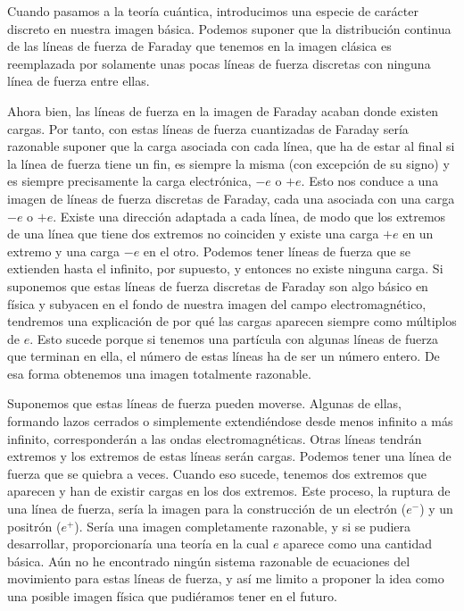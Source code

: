 \documentclass[a4paper, 12pt]{article}
\begin{document}
Cuando pasamos a la teoría cuántica, introducimos una especie de carác\-ter discreto en nuestra imagen básica. Podemos suponer que la distribución continua de las líneas de fuerza de Faraday que tenemos en la imagen clásica es reemplazada por solamente unas pocas líneas de fuerza discretas con ninguna línea de fuerza entre ellas.

Ahora bien, las líneas de fuerza en la imagen de Faraday acaban donde existen cargas. Por tanto, con estas líneas de fuerza cuantizadas de Faraday sería razonable suponer que la carga asociada con cada línea, que ha de estar al final si la línea de fuerza tiene un fin, es siempre la misma (con excepción de su signo) y es siempre precisamente la carga electrónica, $- e$ o $+e$. Esto nos conduce a una imagen de líneas de fuerza discretas de Faraday, cada una asociada con una carga $- e$ o $+ e$. Existe una dirección adaptada a cada línea, de modo que los extremos de una línea que tiene dos extremos no coinciden y existe una carga $+ e$ en un extremo y una carga $- e$ en el otro. Podemos tener líneas de fuerza que se extienden hasta el infinito, por supuesto, y entonces no existe ninguna carga. Si suponemos que estas líneas de fuerza discretas de Faraday son algo básico en física y subyacen en el fondo de nuestra imagen del campo electromagnético, tendremos una explicación de por qué las cargas aparecen siempre como múltiplos de $e$. Esto sucede porque si tenemos una partícula con algunas líneas de fuerza que terminan en ella, el número de estas líneas ha de ser un número entero. De esa forma obtenemos una imagen totalmente razonable.

Suponemos que estas líneas de fuerza pueden moverse. Algunas de ellas, formando lazos cerrados o simplemente extendiéndose desde menos infinito a más infinito, corresponderán a las ondas electromagnéticas. Otras líneas tendrán extremos y los extremos de estas líneas serán cargas. Podemos tener una línea de fuerza que se quiebra a veces. Cuando eso sucede, tenemos dos extremos que aparecen y han de existir cargas en los dos extremos. Este proceso, la ruptura de una línea de fuerza, sería la imagen para la construcción de un electrón ($e^-$) y un positrón ($e^+$). Sería una imagen completamente razonable, y si se pudiera desarrollar, proporcionaría una teoría en la cual $e$ aparece como una cantidad básica. Aún no he encontrado ningún sistema razonable de ecuaciones del movimiento para estas líneas de fuerza, y así me limito a proponer la idea como una posible imagen física que pudiéramos tener en el futuro.
\end{document}
